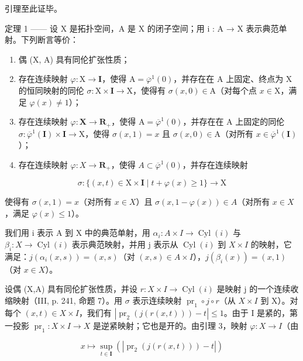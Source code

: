 引理至此证毕。

定理 1 —— 设 X 是拓扑空间，A 是 X 的闭子空间；用 i : A → X 表示典范单射。下列断言等价：

\begin{enumerate}
\def\labelenumi{(\roman{enumi})}
\item
  偶 (X, A) 具有同伦扩张性质；
\item
  存在连续映射 \(\varphi\colon\mathrm{X}\to\mathbf{I}\)，使得 \(\mathrm{A}=\overline{\varphi}^{1}(0)\)，并存在在 A 上固定、终点为 X 的恒同映射的同伦 \(\sigma\colon\mathrm{X}\times\mathbf{I}\to\mathrm{X}\)，使得有 \(\sigma(x,0)\in\mathrm{A}\)（对每个点 \(x\in\mathrm{X}\)，满足 \(\varphi(x)\neq1\)）；
\item
  存在连续映射 \(\varphi\colon\mathbf{X}\to\mathbf{R}_{+}\)，使得 \(\mathrm{A}=\overline{\varphi}^{1}(0)\)，并存在在 A 上固定的同伦 \(\sigma\colon\overline{\varphi}^{1}(\mathbf{I})\times\mathbf{I}\to\mathrm{X}\)，使得 \(\sigma(x,1)=x\) 且 \(\sigma(x,0)\in\mathrm{A}\)（对所有 \(x\in\overline{\varphi}^{1}(\mathbf{I})\)）；
\item
  存在连续映射 \(\varphi\colon X\to\mathbf{R}_{+}\)，使得 \(A\subset\overline{\varphi}^{1}(0)\)，并存在连续映射
\end{enumerate}

\[
\sigma \colon \{(x, t) \in \mathrm{X} \times \mathbf {I} \mid t + \varphi (x) \geqslant 1 \} \to \mathrm{X}
\]

使得有 \(\sigma(x,1) = x\)（对所有 \(x \in X\)）且 \(\sigma(x,1 - \varphi(x)) \in A\)（对所有 \(x \in X\)，满足 \(\varphi(x) \leqslant 1\)）。

我们用 i 表示 A 到 X 中的典范单射，用 \(\alpha_{i}\colon A\times I\to\operatorname{Cyl}(i)\) 与 \(\beta_{i}\colon X\to\operatorname{Cyl}(i)\) 表示典范映射，并用 j 表示从 \(\operatorname{Cyl}(i)\) 到 \(X\times I\) 的映射，它满足：\(j(\alpha_{i}(x,s))=(x,s)\)（对 \((x,s)\in A\times I\)），\(j(\beta_{i}(x))=(x,1)\)（对 \(x\in X\)）。

设偶 (X,A) 具有同伦扩张性质，并设 \(r:X\times I\to\operatorname{Cyl}(i)\) 是映射 j 的一个连续收缩映射（III, p. 241, 命题 7）。用 \(\sigma\) 表示连续映射 \(\operatorname{pr}_1\circ j\circ r\)（从 \(X\times I\) 到 X）。对每个 \((x,t)\in X\times I\)，我们有 \(|\operatorname{pr}_2(j(r(x,t)))-t|\leqslant1\)。由于 I 是紧的，第一投影 \(\operatorname{pr}_1:X\times I\to X\) 是逆紧映射；它也是开的。由引理 3，映射 \(\varphi:X\to I\)（由

\[
x \mapsto \sup _ {t \in \mathbf {I}} \left(\left| \operatorname{pr} _ {2} (j (r (x, t))) - t \right|\right)
\]

